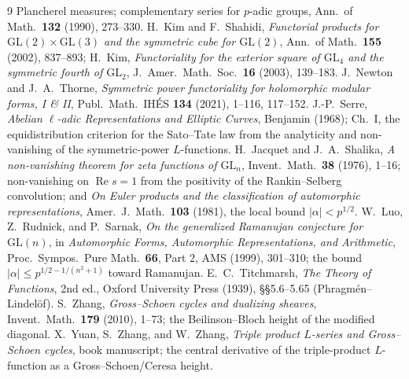 \documentclass[11pt]{article}
\theoremstyle{definition}
\renewcommand{\Re}{\operatorname{Re}}
\begin{document}
\begin{thebibliography}{9}
{Plancherel measures; complementary series for $p$-adic groups}, Ann.\ of Math.\ \textbf{132} (1990),
273--330.
 H.~Kim and F.~Shahidi, \emph{Functorial products for
$\mathrm{GL}(2)\times\mathrm{GL}(3)$ and the symmetric cube for $\mathrm{GL}(2)$}, Ann.\ of Math.\
\textbf{155} (2002), 837--893; H.~Kim, \emph{Functoriality for the exterior square of
$\mathrm{GL}_4$ and the symmetric fourth of $\mathrm{GL}_2$}, J.\ Amer.\ Math.\ Soc.\ \textbf{16}
(2003), 139--183.
 J.~Newton and J.~A.~Thorne, \emph{Symmetric power functoriality for holomorphic modular
forms, I \& II}, Publ.\ Math.\ IH\'ES \textbf{134} (2021), 1--116, 117--152.
\bibitem{Serre} J.-P.~Serre, \emph{Abelian $\ell$-adic Representations and Elliptic Curves}, Benjamin
(1968); Ch.~I, the equidistribution criterion for the Sato--Tate law from the analyticity and
non-vanishing of the symmetric-power $L$-functions.
 H.~Jacquet and J.~A.~Shalika, \emph{A non-vanishing theorem for zeta functions of
$\mathrm{GL}_n$}, Invent.\ Math.\ \textbf{38} (1976), 1--16; non-vanishing on $\Re s=1$ from the
positivity of the Rankin--Selberg convolution; and \emph{On Euler products and the classification of
automorphic representations}, Amer.\ J.\ Math.\ \textbf{103} (1981), the local bound $|\alpha|<p^{1/2}$.
\bibitem{LRS} W.~Luo, Z.~Rudnick, and P.~Sarnak, \emph{On the generalized Ramanujan conjecture for
$\mathrm{GL}(n)$}, in \emph{Automorphic Forms, Automorphic Representations, and Arithmetic}, Proc.\
Sympos.\ Pure Math.\ \textbf{66}, Part 2, AMS (1999), 301--310; the bound
$|\alpha|\le p^{1/2-1/(n^2+1)}$ toward Ramanujan.
\bibitem{Titchmarsh} E.~C.~Titchmarsh, \emph{The Theory of Functions}, 2nd ed., Oxford University
Press (1939), \S\S5.6--5.65 (Phragm\'en--Lindel\"of).
\bibitem{ZhangGS} S.~Zhang, \emph{Gross--Schoen cycles and dualizing sheaves}, Invent.\ Math.\
\textbf{179} (2010), 1--73; the Beilinson--Bloch height of the modified diagonal.
\bibitem{YZZ} X.~Yuan, S.~Zhang, and W.~Zhang, \emph{Triple product $L$-series and Gross--Schoen
cycles}, book manuscript; the central derivative of the triple-product $L$-function as a
Gross--Schoen/Ceresa height.
\end{thebibliography}
\end{document}

